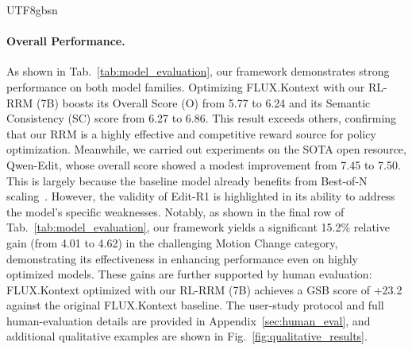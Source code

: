 \documentclass{llmxive}
\begin{document}
\begin{CJK*}{UTF8}{gbsn}
\paragraph{Overall Performance.}
As shown in Tab.~\ref{tab:model_evaluation}, our framework demonstrates strong performance on both model families. Optimizing FLUX.Kontext with our RL-RRM (7B) boosts its Overall Score (O) from 5.77 to 6.24 and its Semantic Consistency (SC) score from 6.27 to 6.86. This result exceeds others, confirming that our RRM is a highly effective and competitive reward source for policy optimization.
Meanwhile, we carried out experiments on the SOTA open resource, Qwen-Edit, whose overall score showed a modest improvement from 7.45 to 7.50. This is largely because the baseline model already benefits from Best-of-N scaling~\cite{luo2025editscore}. However, the validity of Edit-R1 is highlighted in its ability to address the model's specific weaknesses.
Notably, as shown in the final row of Tab.~\ref{tab:model_evaluation}, our framework yields a significant 15.2\% relative gain (from 4.01 to 4.62) in the challenging Motion Change category, demonstrating its effectiveness in enhancing performance even on highly optimized models. These gains are further supported by human evaluation: FLUX.Kontext optimized with our RL-RRM (7B) achieves a GSB score of +23.2 against the original FLUX.Kontext baseline. The user-study protocol and full human-evaluation details are provided in Appendix~\ref{sec:human_eval}, and additional qualitative examples are shown in Fig.~\ref{fig:qualitative_results}.

\end{CJK*}
\end{document}
